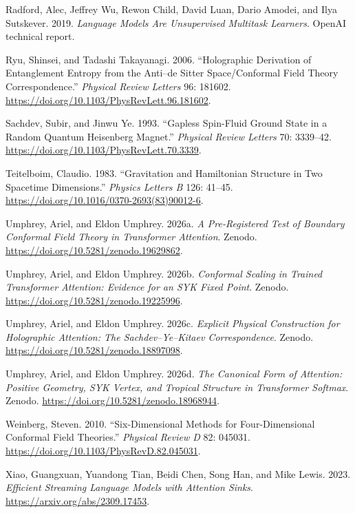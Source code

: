 \begin{CSLReferences}{1}{1}
Radford, Alec, Jeffrey Wu, Rewon Child, David Luan, Dario Amodei, and
Ilya Sutskever. 2019. \emph{Language Models Are Unsupervised Multitask
Learners}. OpenAI technical report.

Ryu, Shinsei, and Tadashi Takayanagi. 2006. {``Holographic Derivation of
Entanglement Entropy from the Anti--de Sitter Space/Conformal Field
Theory Correspondence.''} \emph{Physical Review Letters} 96: 181602.
\url{https://doi.org/10.1103/PhysRevLett.96.181602}.

Sachdev, Subir, and Jinwu Ye. 1993. {``Gapless Spin-Fluid Ground State
in a Random Quantum Heisenberg Magnet.''} \emph{Physical Review Letters}
70: 3339--42. \url{https://doi.org/10.1103/PhysRevLett.70.3339}.

Teitelboim, Claudio. 1983. {``Gravitation and Hamiltonian Structure in
Two Spacetime Dimensions.''} \emph{Physics Letters B} 126: 41--45.
\url{https://doi.org/10.1016/0370-2693(83)90012-6}.

Umphrey, Ariel, and Eldon Umphrey. 2026a. \emph{A Pre-Registered Test of
Boundary Conformal Field Theory in Transformer Attention}. Zenodo.
\url{https://doi.org/10.5281/zenodo.19629862}.

Umphrey, Ariel, and Eldon Umphrey. 2026b. \emph{Conformal Scaling in
Trained Transformer Attention: Evidence for an SYK Fixed Point}. Zenodo.
\url{https://doi.org/10.5281/zenodo.19225996}.

Umphrey, Ariel, and Eldon Umphrey. 2026c. \emph{Explicit Physical
Construction for Holographic Attention: The Sachdev--Ye--Kitaev
Correspondence}. Zenodo. \url{https://doi.org/10.5281/zenodo.18897098}.

Umphrey, Ariel, and Eldon Umphrey. 2026d. \emph{The Canonical Form of
Attention: Positive Geometry, {SYK} Vertex, and Tropical Structure in
Transformer Softmax}. Zenodo.
\url{https://doi.org/10.5281/zenodo.18968944}.

Weinberg, Steven. 2010. {``Six-Dimensional Methods for Four-Dimensional
Conformal Field Theories.''} \emph{Physical Review D} 82: 045031.
\url{https://doi.org/10.1103/PhysRevD.82.045031}.

Xiao, Guangxuan, Yuandong Tian, Beidi Chen, Song Han, and Mike Lewis.
2023. \emph{Efficient Streaming Language Models with Attention Sinks}.
\url{https://arxiv.org/abs/2309.17453}.

\end{CSLReferences}

